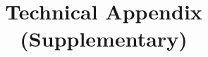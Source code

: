 \documentclass[letterpaper,oneside]{article}
\title{Technical Appendix (Supplementary)}
\author{}
\date{}
\begin{document}
\maketitle

\appendix
\renewcommand{\thesection}{A}
\renewcommand{\thesubsection}{A.\arabic{subsection}}
\renewcommand{\thesubsubsection}{A.\arabic{subsection}.\arabic{subsubsection}}





\clearpage





\end{document}
